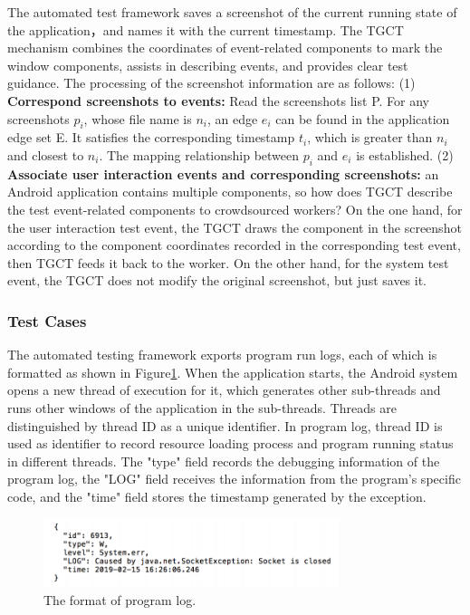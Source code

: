 The automated test framework saves a screenshot of the current running state of the application，and names it with the current timestamp. The TGCT mechanism combines the coordinates of event-related components to mark the window components, assists in describing events, and provides clear test guidance. The processing of the screenshot information are as follows: (1) \textbf{Correspond screenshots to events:} Read the screenshots list P. For any screenshots $p_{i}$, whose file name is $n_{i}$, an edge $e_{i}$ can be found in the application edge set E. It satisfies the corresponding timestamp $t_{i}$, which is greater than $n_{i}$ and closest to $n_{i}$. The mapping relationship between $p_{i}$ and $e_{i}$ is established.
(2) \textbf{Associate user interaction events and corresponding screenshots:} an Android application contains multiple components, so how does TGCT describe the test event-related components to crowdsourced workers? On the one hand, for the user interaction test event, the TGCT draws the component in the screenshot according to the component coordinates recorded in the corresponding test event, then TGCT feeds it back to the worker. On the other hand, for the system test event, the TGCT does not modify the original screenshot, but just saves it.

\subsubsection{Test Cases}
The automated testing framework exports program run logs, each of which is formatted as shown in Figure\ref{fig:foramt2}. When the application starts, the Android system opens a new thread of execution for it, which generates other sub-threads and runs other windows of the application in the sub-threads. Threads are distinguished by thread ID as a unique identifier. In program log, thread ID is used as identifier to record resource loading process and program running status in different threads. The "type" field records the debugging information of the program log, the "LOG" field receives the information from the program's specific code, and the "time" field stores the timestamp generated by the exception. 
\begin{figure}[htbp]
\centering
\centerline{\includegraphics[width=\columnwidth,height=2cm]{fig/5.png}}
\caption{The format of program log.}
\label{fig:foramt2}
\end{figure}

